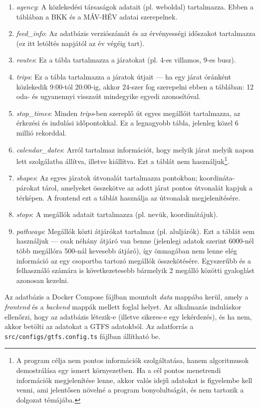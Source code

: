 \begin{enumerate}
    \item \textit{agency}: A közlekedési társaságok adatait (pl. weboldal) tartalmazza. Ebben a táblában a BKK és a MÁV-HÉV adatai szerepelnek.
    \item \textit{feed\_info}: Az adatbázis verziószámát és az érvényességi időszakot tartalmazza (ez itt letöltés napjától az év végéig tart).
    \item \textit{routes}: Ez a tábla tartalmazza a járatokat (pl. 4-es villamos, 9-es busz).
    \item \textit{trips}: Ez a tábla tartalmazza a járatok útjait --- ha egy járat óránként közlekedik 9:00-tól 20:00-ig, akkor 24-szer fog szerepelni ebben a táblában: 12 oda- és ugyanennyi visszaút mindegyike egyedi azonosítóval.
    \item \textit{stop\_times}: Minden \textit{trips}-ben szereplő út egyes megállóit tartalmazza, az érkezési és indulási időpontokkal. Ez a legnagyobb tábla, jelenleg közel 6 millió rekorddal.
    \item \textit{calendar\_dates}: Arról tartalmaz információt, hogy melyik járat melyik napon lett szolgálatba állítva, illetve kiállítva. Ezt a táblát nem használjuk\footnote{A program célja nem pontos információk szolgáltatása, hanem algoritmusok demostrálása egy ismert környezetben. Ha a cél pontos menetrendi információk megjelenítése lenne, akkor valós idejű adatokat is figyelembe kell venni, ami jelentősen növelné a program bonyolultságát, és nem tartozik a dolgozat témájába.}.
    \item \textit{shapes}: Az egyes járatok útvonalát tartalmazza pontokban; koordináta-párokat tárol, amelyeket összekötve az adott járat pontos útvonalát kapjuk a térképen. A frontend ezt a táblát használja az útvonalak megjelenítésére.
    \item \textit{stops}: A megállók adatait tartalmazza (pl. nevük, koordinátájuk).
    \item \textit{pathways}: Megállók közti átjárókat tartalmaz (pl. aluljárók). Ezt a táblát sem használjuk --- csak néhány átjáró van benne (jelenlegi adatok szerint 6000-nél több megállóra 500-nál kevesebb átjáró), így önmagában nem lenne elég információ az egy csoportba tartozó megállók összekötésére. Egyszerűbb és a felhasználó számára is következetesebb bármelyik 2 megálló közötti gyaloglást azonosan kezelni.
\end{enumerate}

Az adatbázis a Docker Compose fájlban mountolt \textit{data} mappába kerül, amely a \textit{frontend} és a \textit{backend} mappák mellett foglal helyet. Az alkalmazás induláskor ellenőrzi, hogy az adatbázis létezik-e (illetve sikeres-e egy lekérdezés), és ha nem, akkor betölti az adatokat a GTFS adatokból. Az adatforrás a \texttt{src/configs/gtfs.config.ts} fájlban állítható be.

